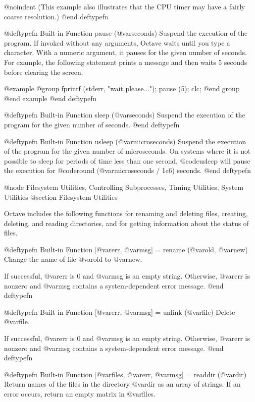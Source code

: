 {{@noindent
(This example also illustrates that the CPU timer may have a fairly
coarse resolution.)
@end deftypefn

@deftypefn {Built-in Function} {} pause (@var{seconds})
Suspend the execution of the program.  If invoked without any arguments,
Octave waits until you type a character.  With a numeric argument, it
pauses for the given number of seconds.  For example, the following
statement prints a message and then waits 5 seconds before clearing the
screen.

@example
@group
fprintf (stderr, "wait please...\n");
pause (5);
clc;
@end group
@end example
@end deftypefn

@deftypefn {Built-in Function} {} sleep (@var{seconds})
Suspend the execution of the program for the given number of seconds.
@end deftypefn

@deftypefn {Built-in Function} {} usleep (@var{microseconds})
Suspend the execution of the program for the given number of
microseconds.  On systems where it is not possible to sleep for periods
of time less than one second, @code{usleep} will pause the execution for
@code{round (@var{microseconds} / 1e6)} seconds.
@end deftypefn

@node Filesystem Utilities, Controlling Subprocesses, Timing Utilities, System Utilities
@section Filesystem Utilities

Octave includes the following functions for renaming and deleting files,
creating, deleting, and reading directories, and for getting information
about the status of files.

@deftypefn {Built-in Function} {[@var{err}, @var{msg}] =} rename (@var{old}, @var{new})
Change the name of file @var{old} to @var{new}.

If successful, @var{err} is 0 and @var{msg} is an empty string.
Otherwise, @var{err} is nonzero and @var{msg} contains a
system-dependent error message.
@end deftypefn

@deftypefn {Built-in Function} {[@var{err}, @var{msg}] =} unlink (@var{file})
Delete @var{file}.

If successful, @var{err} is 0 and @var{msg} is an empty string.
Otherwise, @var{err} is nonzero and @var{msg} contains a
system-dependent error message.
@end deftypefn

@deftypefn {Built-in Function} {[@var{files}, @var{err}, @var{msg}] =} readdir (@var{dir})
Return names of the files in the directory @var{dir} as an array of
strings.  If an error occurs, return an empty matrix in @var{files}.

}}
